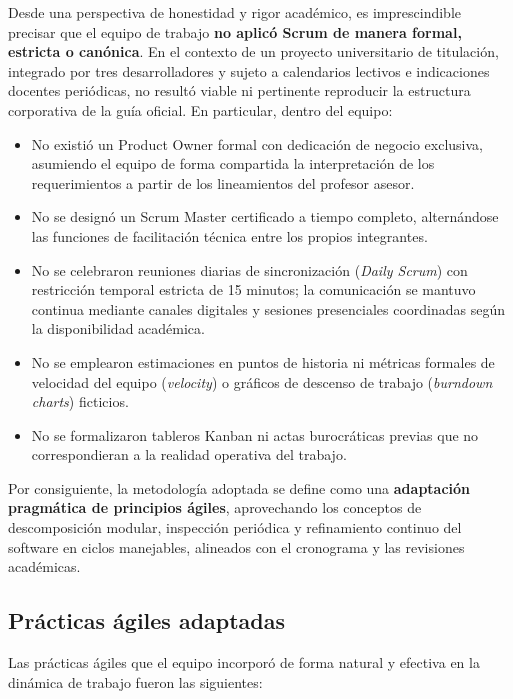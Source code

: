 Desde una perspectiva de honestidad y rigor académico, es imprescindible precisar que el equipo de trabajo \textbf{no aplicó Scrum de manera formal, estricta o canónica}. En el contexto de un proyecto universitario de titulación, integrado por tres desarrolladores y sujeto a calendarios lectivos e indicaciones docentes periódicas, no resultó viable ni pertinente reproducir la estructura corporativa de la guía oficial. En particular, dentro del equipo:
\begin{itemize}
    \item No existió un Product Owner formal con dedicación de negocio exclusiva, asumiendo el equipo de forma compartida la interpretación de los requerimientos a partir de los lineamientos del profesor asesor.
    \item No se designó un Scrum Master certificado a tiempo completo, alternándose las funciones de facilitación técnica entre los propios integrantes.
    \item No se celebraron reuniones diarias de sincronización (\textit{Daily Scrum}) con restricción temporal estricta de 15 minutos; la comunicación se mantuvo continua mediante canales digitales y sesiones presenciales coordinadas según la disponibilidad académica.
    \item No se emplearon estimaciones en puntos de historia ni métricas formales de velocidad del equipo (\textit{velocity}) o gráficos de descenso de trabajo (\textit{burndown charts}) ficticios.
    \item No se formalizaron tableros Kanban ni actas burocráticas previas que no correspondieran a la realidad operativa del trabajo.
\end{itemize}

Por consiguiente, la metodología adoptada se define como una \textbf{adaptación pragmática de principios ágiles}, aprovechando los conceptos de descomposición modular, inspección periódica y refinamiento continuo del software en ciclos manejables, alineados con el cronograma y las revisiones académicas.

\subsection{Prácticas ágiles adaptadas}
\label{sec:practicas_adaptadas}

Las prácticas ágiles que el equipo incorporó de forma natural y efectiva en la dinámica de trabajo fueron las siguientes:

